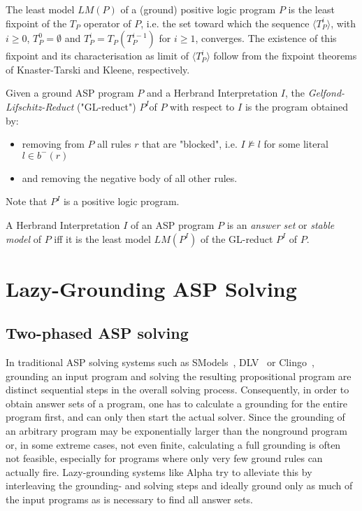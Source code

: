 \begin{definition}
\label{def:prelims-asp-semantics-least-model}
The least model $LM(P)$ of a (ground) positive logic program $P$ is the least fixpoint of the $T_P$ operator  of $P$, i.e. the set toward which the sequence $\langle T^{i}_{P} \rangle$, with $i \geq 0$, $T^{0}_P = \emptyset$ and $T^{i}_P = T_P(T^{i-1}_P)$ for $i \geq 1$, converges. The existence of this fixpoint and its characterisation as limit of $\langle T^{i}_{P} \rangle$ follow from the fixpoint theorems of Knaster-Tarski and Kleene, respectively.
\end{definition}

\begin{definition}
\label{def:prelims-asp-semantics-gl-reduct}
Given a ground ASP program $P$ and a Herbrand Interpretation $I$, the \emph{Gelfond-Lifschitz-Reduct} ("GL-reduct") $P^{I}$of $P$ with respect to $I$ is the program obtained by:
\begin{itemize}
	\item removing from $P$ all rules $r$ that are "blocked", i.e. $I \not\models l$ for some literal $l \in b^{-}(r)$ 
	\item and removing the negative body of all other rules.
\end{itemize}
Note that $P^{I}$ is a positive logic program.
\end{definition}

\begin{definition}
A Herbrand Interpretation $I$ of an ASP program $P$ is an \emph{answer set} or \emph{stable model} of $P$ iff it is the least model $LM(P^I)$ of the GL-reduct $P^I$ of $P$.
\end{definition}

\section{Lazy-Grounding ASP Solving}

\subsection{Two-phased ASP solving}
In traditional ASP solving systems such as SModels~\cite{smodels}, DLV~\cite{dlv} or Clingo~\cite{clingo}, grounding an input program and solving the resulting propositional program are distinct sequential steps in the overall solving process. Consequently, in order to obtain answer sets of a program, one has to calculate a grounding for the entire program first, and can only then start the actual solver. Since the grounding of an arbitrary program may be exponentially larger than the nonground program or, in some extreme cases, not even finite, calculating a full grounding is often not feasible, especially for programs where only very few ground rules can actually fire. Lazy-grounding systems like Alpha try to alleviate this by interleaving the grounding- and solving steps and ideally ground only as much of the input programs as is necessary to find all answer sets.

